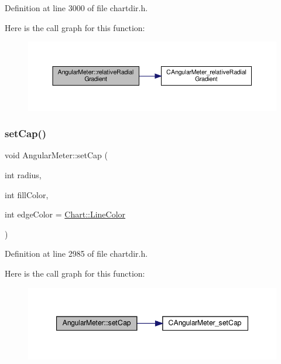 Definition at line 3000 of file chartdir.\+h.

Here is the call graph for this function\+:
\nopagebreak
\begin{figure}[H]
\begin{center}
\leavevmode
\includegraphics[width=350pt]{class_angular_meter_a3f2a73796ea3c4aba359042a810b0339_cgraph}
\end{center}
\end{figure}
\mbox{\label{class_angular_meter_a0e20598329d17a1ac23b73fea207a6b7}} 
\subsubsection{\texorpdfstring{set\+Cap()}{setCap()}}
{\footnotesize\ttfamily void Angular\+Meter\+::set\+Cap (\begin{DoxyParamCaption}\item[{int}]{radius,  }\item[{int}]{fill\+Color,  }\item[{int}]{edge\+Color = {\ttfamily \hyperlink{namespace_chart_abee0d882fdc9ad0b001245ad9fc64011a04817a359476e87a5c572a7a69cdaaec}{Chart\+::\+Line\+Color}} }\end{DoxyParamCaption})\hspace{0.3cm}{\ttfamily [inline]}}



Definition at line 2985 of file chartdir.\+h.

Here is the call graph for this function\+:
\nopagebreak
\begin{figure}[H]
\begin{center}
\leavevmode
\includegraphics[width=347pt]{class_angular_meter_a0e20598329d17a1ac23b73fea207a6b7_cgraph}
\end{center}
\end{figure}
\mbox{\label{class_angular_meter_a80b2f6a0dea2b4968ef7cca433e85a1d}} 
